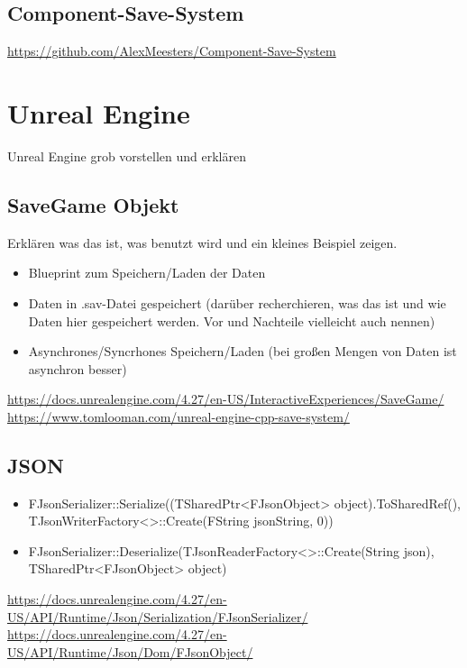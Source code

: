 \subsection{Component-Save-System}

\url{https://github.com/AlexMeesters/Component-Save-System}


\section{Unreal Engine}
Unreal Engine grob vorstellen und erklären

\subsection{SaveGame Objekt}
Erklären was das ist, was benutzt wird und ein kleines Beispiel zeigen.

\begin{itemize}
    \item Blueprint zum Speichern/Laden der Daten
    \item Daten in .sav-Datei gespeichert (darüber recherchieren, was das ist und wie Daten hier gespeichert werden. Vor und Nachteile vielleicht auch nennen)
    \item Asynchrones/Syncrhones Speichern/Laden (bei großen Mengen von Daten ist asynchron besser)
\end{itemize}

\url{https://docs.unrealengine.com/4.27/en-US/InteractiveExperiences/SaveGame/}\\
\url{https://www.tomlooman.com/unreal-engine-cpp-save-system/}

\subsection{JSON}

\begin{itemize}
    \item FJsonSerializer::Serialize((TSharedPtr<FJsonObject> object).ToSharedRef(), TJsonWriterFactory<>::Create(FString jsonString, 0))
    \item FJsonSerializer::Deserialize(TJsonReaderFactory<>::Create(String json), TSharedPtr<FJsonObject> object)
\end{itemize}
\url{https://docs.unrealengine.com/4.27/en-US/API/Runtime/Json/Serialization/FJsonSerializer/}\\
\url{https://docs.unrealengine.com/4.27/en-US/API/Runtime/Json/Dom/FJsonObject/}

